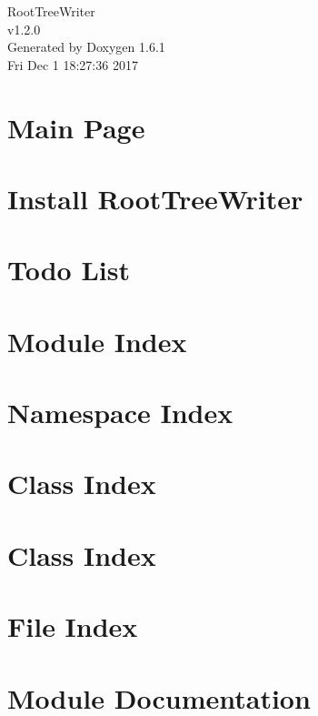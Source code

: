 \documentclass[a4paper]{book}
\begin{document}
\begin{titlepage}
\vspace*{7cm}
\begin{center}
{\Large RootTreeWriter \\[1ex]\large v1.2.0 }\\
\vspace*{1cm}
{\large Generated by Doxygen 1.6.1}\\
\vspace*{0.5cm}
{\small Fri Dec 1 18:27:36 2017}\\
\end{center}
\end{titlepage}
\clearemptydoublepage
{}
\tableofcontents
\clearemptydoublepage
{}
\chapter{Main Page}
\label{index}
\chapter{Install RootTreeWriter}
\label{general_install}

\chapter{Todo List}
\label{todo}

\chapter{Module Index}

\chapter{Namespace Index}

\chapter{Class Index}

\chapter{Class Index}

\chapter{File Index}

\chapter{Module Documentation}

\end{document}
